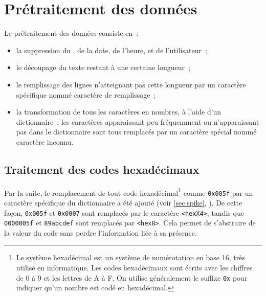 \pagebreak
\section{Prétraitement des données}\label{def_dict_papud}
Le prétraitement des données consiste en~:
\begin{itemize}
	\item la suppression du , de la date, de l'heure, et de l'utilisateur~;
	\item le découpage du texte restant à une certaine longueur~;
	\item le remplissage des lignes n'atteignant pas cette longueur par un caractère spécifique nommé caractère de remplissage~;
	\item la transformation de tous les caractères en nombres, à l'aide d'un dictionnaire~; les caractères apparaissant peu fréquemment ou n'apparaissant pas dans le dictionnaire sont tous remplacés par un caractère spécial nommé \og caractère inconnu\fg{}.
\end{itemize}

\subsection{Traitement des codes hexadécimaux}\label{hex}
Par la suite, le remplacement de tout code hexadécimal\footnote{Le système hexadécimal est un système de numérotation en base 16, très utilisé en informatique. Les codes hexadécimaux sont écrits avec les chiffres de 0 à 9 et les lettres de A à F. On utilise généralement le suffixe \lstinline|0x| pour indiquer qu'un nombre est codé en hexadécimal.} comme \lstinline|0x005f| par un caractère spécifique du dictionnaire a été ajouté (voir \autoref{sec:spike}, ).
De cette façon, \lstinline|0x005f| et \lstinline|0x0007| sont remplacés par le caractère  \lstinline|<hexX4>|, tandis que  \lstinline|0000005f| et  \lstinline|89abcdef| sont remplacés par  \lstinline|<hex8>|.
Cela permet de s'abstraire de la valeur du code sans perdre l'information liée à sa présence.

